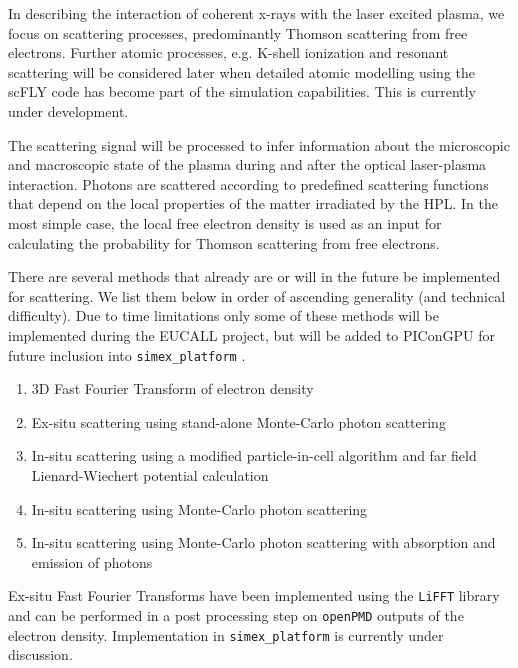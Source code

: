 \documentclass[12pt]{scrartcl}
\begin{document}
In describing the interaction of coherent x-rays with the laser excited plasma,
we focus on scattering processes, predominantly Thomson scattering from free
electrons. Further atomic processes, e.g. K-shell ionization and resonant
scattering will be considered later when detailed atomic modelling using the
scFLY code \cite{Chung2007} has become part of the simulation capabilities. This is
currently under development.

The scattering signal will be processed to
infer information about the microscopic and macroscopic state of the plasma
during and after the optical laser-plasma interaction.  Photons are scattered
according to predefined scattering functions that depend on the local properties
of the matter irradiated by the HPL. In the most simple case, the local free
electron density is used as an input for calculating the probability for Thomson
scattering from free electrons.

There are several methods that already are or will in the future be implemented for
scattering. We list them below in order of ascending generality (and technical
difficulty). Due to time limitations only some of these methods will be implemented
during the EUCALL project, but will be added to PIConGPU for future inclusion into
\texttt{simex\_platform} .

\begin{enumerate}
  \item 3D Fast Fourier Transform of electron density
    \label{pmi:methods:fft}
  \item Ex-situ scattering using stand-alone
    Monte-Carlo photon scattering \label{pmi:methods:exsituphoton}
  \item In-situ scattering using a modified particle-in-cell algorithm and far field
      Lienard-Wiechert potential calculation \label{pmi:methods:insitulienardwiechert}
    \item In-situ scattering using Monte-Carlo photon
    scattering\label{pmi:methods:insituphoton}
  \item In-situ scattering using Monte-Carlo photon scattering with absorption
    and emission of photons\label{pmi:methods:insituphotoninteract}
\end{enumerate}

Ex-situ Fast Fourier Transforms have been implemented using the \texttt{LiFFT}
library \cite{liblifft_github} and can be performed in a post processing step on
\texttt{openPMD} outputs of the electron density. Implementation in
\texttt{simex\_platform} is currently under discussion.
\end{document}
